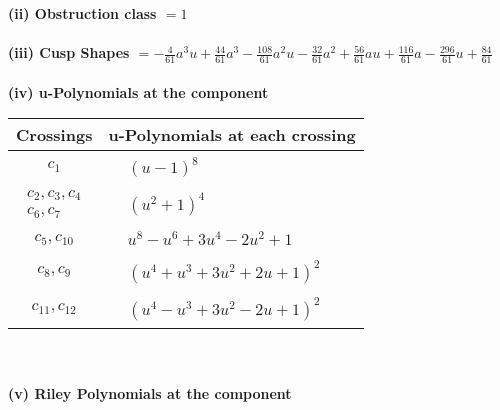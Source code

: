 \documentclass[1p]{elsarticle_modified}
\theoremstyle{definition}
\begin{document}
\flushleft \textbf{(ii) Obstruction class $= 1$}\\~\\
\flushleft \textbf{(iii) Cusp Shapes $= -\frac{4}{61} a^3 u+\frac{44}{61} a^3-\frac{108}{61} a^2 u-\frac{32}{61} a^2+\frac{56}{61} a u+\frac{116}{61} a-\frac{296}{61} u+\frac{84}{61}$}\\~\\
\newpage\renewcommand{\arraystretch}{1}
\flushleft \textbf{(iv) u-Polynomials at the component}\newline \\
\begin{tabular}{m{50pt}|m{274pt}}
Crossings & \hspace{64pt}u-Polynomials at each crossing \\
\hline $$\begin{aligned}c_{1}\end{aligned}$$&$\begin{aligned}
&(u-1)^8
\end{aligned}$\\
\hline $$\begin{aligned}c_{2},c_{3},c_{4}\\c_{6},c_{7}\end{aligned}$$&$\begin{aligned}
&(u^2+1)^4
\end{aligned}$\\
\hline $$\begin{aligned}c_{5},c_{10}\end{aligned}$$&$\begin{aligned}
&u^8- u^6+3 u^4-2 u^2+1
\end{aligned}$\\
\hline $$\begin{aligned}c_{8},c_{9}\end{aligned}$$&$\begin{aligned}
&(u^4+u^3+3 u^2+2 u+1)^2
\end{aligned}$\\
\hline $$\begin{aligned}c_{11},c_{12}\end{aligned}$$&$\begin{aligned}
&(u^4- u^3+3 u^2-2 u+1)^2
\end{aligned}$\\
\hline
\end{tabular}\\~\\
\newpage\renewcommand{\arraystretch}{1}
\flushleft \textbf{(v) Riley Polynomials at the component}\newline \\
\end{document}
